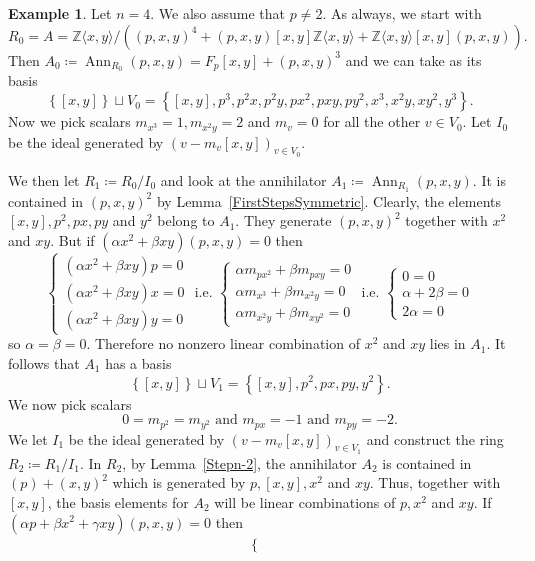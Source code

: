 \documentclass[11pt]{article}
\DeclareMathOperator{\Ann}{Ann}
\theoremstyle{definition}
\newtheorem{numberedexample}[corollary]{Example}
\begin{document}
\begin{numberedexample}
Let $n=4$. We also assume that $p\neq 2$. As always, we start with
\[R_0=A=\mathbb{Z}\langle x,y\rangle/\left((p,x,y)^4+(p,x,y)[x,y]\mathbb{Z}\langle x,y\rangle+\mathbb{Z}\langle x,y\rangle[x,y](p,x,y)\right).\]
Then $A_0\coloneqq\Ann_{R_0}(p,x,y)=F_p[x,y]+(p,x,y)^3$ and we can take as its basis
\[\left\lbrace [x,y]\right\rbrace\sqcup V_0=\left\lbrace [x,y],p^3,p^2x,p^2y,px^2,pxy,py^2,x^3,x^2y,xy^2,y^3\right\rbrace.\]
Now we pick scalars $m_{x^3}=1,m_{x^2y}=2$ and $m_v=0$ for all the other $v\in V_0$. Let $I_0$ be the ideal generated by $\left(v-m_v[x,y]\right)_{v\in V_0}$.

We then let $R_1\coloneqq R_0/I_0$ and look at the annihilator $A_1\coloneqq \Ann_{R_1}(p,x,y)$. It is contained in $(p,x,y)^2$ by Lemma~\ref{FirstStepsSymmetric}. Clearly, the elements $[x,y],p^2,px,py$ and $y^2$ belong to $A_1$. They generate $(p,x,y)^2$ together with $x^2$ and $xy$. But if $(\alpha x^2+\beta xy)(p,x,y)=0$ then
\[\begin{cases}
(\alpha x^2+\beta xy)p=0\\
(\alpha x^2+\beta xy)x=0\\
(\alpha x^2+\beta xy)y=0
\end{cases} \text{ i.e. }\begin{cases}
\alpha m_{px^2}+\beta m_{pxy}=0\\
\alpha m_{x^3}+\beta m_{x^2y}=0\\
\alpha m_{x^2y}+\beta m_{xy^2}=0
\end{cases} \text{ i.e. }\begin{cases}
0=0\\
\alpha+2\beta=0\\
2\alpha=0
\end{cases}\]
so $\alpha=\beta=0$. Therefore no nonzero linear combination of $x^2$ and $xy$ lies in $A_1$. It follows that $A_1$ has a basis
\[\left\lbrace [x,y]\right\rbrace\sqcup V_1=\left\lbrace [x,y],p^2,px,py,y^2\right\rbrace.\]
We now pick scalars
\[0=m_{p^2}=m_{y^2}\text{ and }m_{px}=-1\text{ and }m_{py}=-2.\]
We let $I_1$ be the ideal generated by $\left(v-m_v[x,y]\right)_{v\in V_1}$ and construct the ring $R_2\coloneqq R_1/I_1$.
In $R_2$, by Lemma~\ref{Stepn-2}, the annihilator $A_2$ is contained in $(p)+(x,y)^2$ which is generated by $p,[x,y],x^2$ and $xy$. Thus, together with $[x,y]$, the basis elements for $A_2$ will be linear combinations of $p,x^2$ and $xy$. If $(\alpha p+\beta x^2+\gamma xy)(p,x,y)=0$ then
\begin{align*}
\begin{cases}

\end{cases}
\end{align*}
\end{numberedexample}
\end{document}
